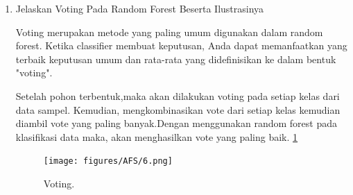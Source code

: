 \begin{enumerate}
\begin {enumerate}
Kemudian kita dapat mencari nilai Recall, Precision, accuracy dan Error Rate

 Recall =3/(1+3) = 0,75

 Precision = 3/(1+3) = 0,75

 Accuracy =(5+3)/(5+1+1+3) = 0,8

 Error Rate =(1+1)/(5+1+1+3) = 0,2

\end {enumerate}

\item Jelaskan Voting Pada Random Forest Beserta Ilustrasinya 
\par Voting merupakan metode yang paling umum digunakan dalam random forest. Ketika classifier membuat keputusan, Anda dapat memanfaatkan yang terbaik keputusan umum dan rata-rata yang didefinisikan ke dalam bentuk "voting".
\par Setelah pohon terbentuk,maka akan dilakukan voting pada setiap kelas dari data sampel. Kemudian, mengkombinasikan vote dari setiap kelas kemudian diambil vote yang paling banyak.Dengan menggunakan random forest pada klasifikasi data maka, akan menghasilkan vote yang paling baik. \ref{AFS6}
		\begin{figure}[ht]
		\centerline{\texttt{[image: figures/AFS/6.png]}}
		\caption{Voting.}
		\label{AFS6}
		\end{figure}
\end{enumerate}



